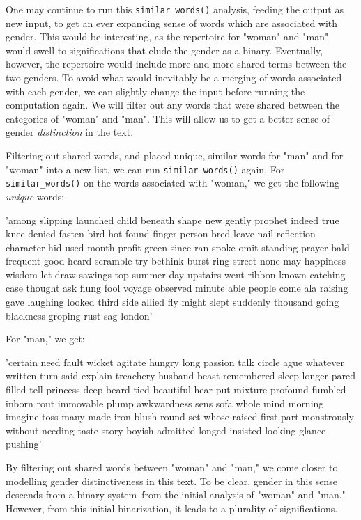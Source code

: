 \documentclass[11pt]{article}
\begin{document}
One may continue to run this \texttt{similar\_words()} analysis, feeding the
output as new input, to get an ever expanding sense of words which are
associated with gender. This would be interesting, as the repertoire
for "woman" and "man" would swell to significations that elude the
gender as a binary. Eventually, however, the repertoire would include
more and more shared terms between the two genders. To avoid what
would inevitably be a merging of words associated with each gender, we
can slightly change the input before running the computation again. We
will filter out any words that were shared between the categories of
"woman" and "man". This will allow us to get a better sense of gender
\emph{distinction} in the text.

Filtering out shared words, and placed unique, similar words for "man"
and for "woman" into a new list, we can run \texttt{similar\_words()}
again. For \texttt{similar\_words()} on the words associated with "woman," we
get the following \emph{unique} words:

\begin{SOURCE}
'among slipping launched child beneath shape new gently prophet indeed
true knee denied fasten bird hot found finger person bred leave nail
reflection character hid used month profit green since ran spoke omit
standing prayer bald frequent good heard scramble try bethink burst
ring street none may happiness wisdom let draw sawings top summer day
upstairs went ribbon known catching case thought ask flung fool voyage
observed minute able people come ala raising gave laughing looked
third side allied fly might slept suddenly thousand going blackness
groping rust sag london'
\end{SOURCE}

For "man," we get:

\begin{SOURCE}
'certain need fault wicket agitate hungry long passion talk circle
ague whatever written turn said explain treachery husband beast
remembered sleep longer pared filled tell princess deep beard tied
beautiful hear put mixture profound fumbled inborn rout immovable
plump awkwardness sens sofa whole mind morning imagine toss many made
iron blush round set whose raised first part monstrously without
needing taste story boyish admitted longed insisted looking glance
pushing'
\end{SOURCE}

By filtering out shared words between "woman" and "man," we come
closer to modelling gender distinctiveness in this text. To be clear,
gender in this sense descends from a binary system--from the initial
analysis of "woman" and "man." However, from this initial
binarization, it leads to a plurality of significations.  
\end{document}

